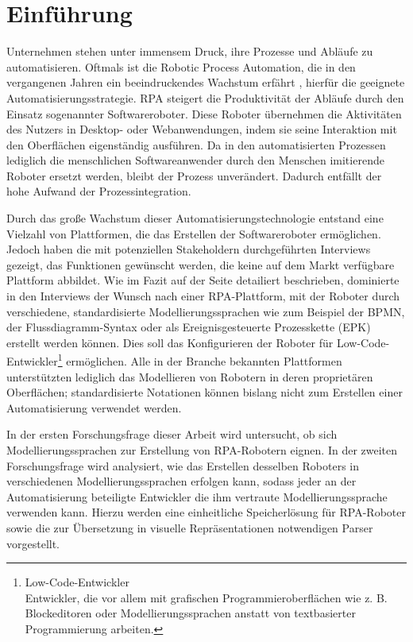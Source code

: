 \section{Einführung}
\label{sec:ein}

Unternehmen stehen unter immensem Druck, ihre Prozesse und Abläufe zu automatisieren. Oftmals ist die Robotic Process Automation, die in den vergangenen Jahren ein beeindruckendes Wachstum erfährt \cite{GartnerQuadrant},  hierfür die geeignete Automatisierungsstrategie. RPA steigert die Produktivität der Abläufe durch den Einsatz sogenannter Softwareroboter. Diese Roboter übernehmen die Aktivitäten des Nutzers in Desktop- oder Webanwendungen, indem sie seine Interaktion mit den Oberflächen eigenständig ausführen. Da in den automatisierten Prozessen lediglich die menschlichen Softwareanwender durch den Menschen imitierende Roboter ersetzt werden, bleibt der Prozess unverändert. Dadurch entfällt der hohe Aufwand der Prozessintegration. 

Durch das große Wachstum dieser Automatisierungstechnologie entstand eine Vielzahl von Plattformen, die das Erstellen der Softwareroboter ermöglichen. Jedoch haben die mit potenziellen Stakeholdern durchgeführten Interviews gezeigt, das Funktionen gewünscht werden, die keine auf dem Markt verfügbare Plattform abbildet.
Wie im Fazit auf der Seite \pageref{anforderungsanalyse:fazit} detailiert beschrieben, dominierte in den Interviews der Wunsch nach einer RPA-Plattform, mit der Roboter durch verschiedene, standardisierte Modellierungssprachen wie zum Beispiel der BPMN, der Flussdiagramm-Syntax oder als Ereignisgesteuerte Prozesskette (EPK) erstellt werden können. Dies soll das Konfigurieren der Roboter für Low-Code-Entwickler\footnote{Low-Code-Entwickler\\ Entwickler, die vor allem mit grafischen Programmieroberflächen wie z. B. Blockeditoren oder Modellierungssprachen anstatt von textbasierter Programmierung arbeiten.} ermöglichen. Alle in der Branche bekannten Plattformen unterstützten lediglich das Modellieren von Robotern in deren proprietären Oberflächen; standardisierte Notationen können bislang nicht zum Erstellen einer Automatisierung verwendet werden. 

In der ersten Forschungsfrage dieser Arbeit wird untersucht, ob sich Modellierungssprachen zur Erstellung von RPA-Robotern eignen. In der zweiten Forschungsfrage wird analysiert, wie das Erstellen desselben Roboters in verschiedenen Modellierungssprachen erfolgen kann, sodass jeder an der Automatisierung beteiligte Entwickler die ihm vertraute Modellierungssprache verwenden kann. Hierzu werden eine einheitliche Speicherlösung für RPA-Roboter sowie die zur Übersetzung in visuelle Repräsentationen notwendigen Parser vorgestellt.


